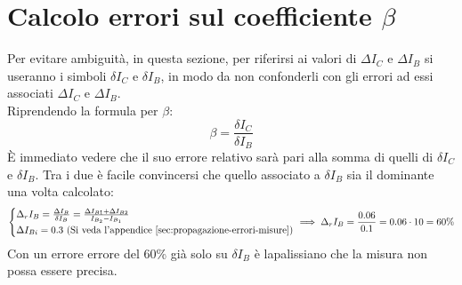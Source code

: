 \documentclass[../main.tex]{subfiles}
\begin{document}
\section{Calcolo errori sul coefficiente $\beta$}
  \label{sec:errori-beta}
  Per evitare ambiguità, in questa sezione, per riferirsi ai valori
  di $\varDelta I_C$ e $\varDelta I_B$ si useranno i simboli
  $\delta I_C$ e $\delta I_B$, in modo da non confonderli con gli
  errori ad essi associati $\Delta I_C$ e $\Delta I_B$.\\

  \noindent Riprendendo la formula per $\beta$:
  \begin{equation*}
    \beta = \frac{\delta I_C}{\delta I_B}
  \end{equation*}
  È immediato vedere che il suo errore relativo sarà pari alla somma
  di quelli di $\delta I_C$ e $\delta I_B$.
  Tra i due è facile convincersi che quello associato a
  $\delta I_B$ sia il dominante una volta calcolato:
  \begin{equation*}
    \left\{
    \begin{array}{@{}l@{}}
      \Delta_r I_B = \frac{\Delta I_B}{\delta I_B} = \frac{\Delta I_{B1} + \Delta I_{B2}}{I_{B_2} - I_{B_1}} \\[1ex]
      \Delta I_{Bi} = 0.3 \text{ (Si veda l'appendice~\ref{sec:propagazione-errori-misure})}
    \end{array}\right. \implies
    \Delta_r I_B = \frac{0.06}{0.1} = 0.06 \cdot 10 = 60\%
  \end{equation*}
  Con un errore errore del 60\% già solo su $\delta I_B$ è
  lapalissiano che la misura non possa essere precisa.
\end{document}
